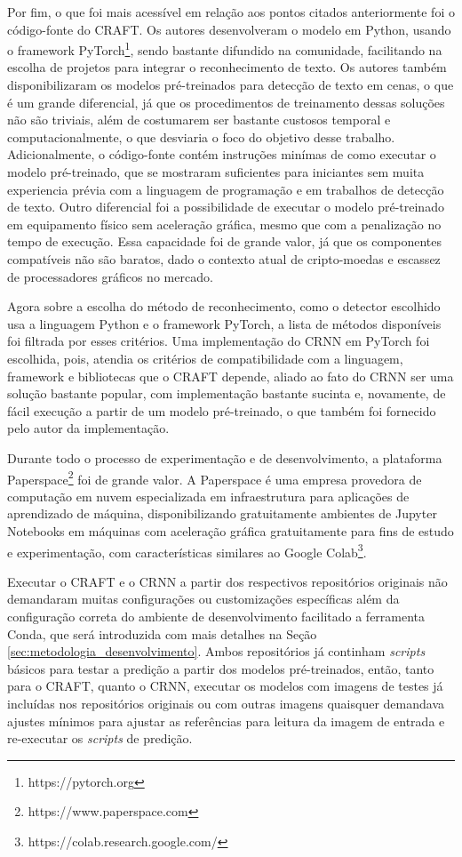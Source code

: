 Por fim, o que foi mais acessível em relação aos pontos citados anteriormente foi o código-fonte do CRAFT. Os autores desenvolveram o modelo em 
Python, usando o framework PyTorch\footnote{https://pytorch.org}, sendo bastante difundido na comunidade, facilitando na escolha de projetos para 
integrar o reconhecimento de texto. Os autores também disponibilizaram os modelos pré-treinados para detecção de texto em cenas, o que é um 
grande diferencial, já que os procedimentos de treinamento dessas soluções não são triviais, além de costumarem ser bastante custosos temporal 
e computacionalmente, o que desviaria o foco do objetivo desse trabalho. Adicionalmente, o código-fonte contém instruções minímas de como executar 
o modelo pré-treinado, que se mostraram suficientes para iniciantes sem muita experiencia prévia com a linguagem de programação e em trabalhos 
de detecção de texto. Outro diferencial foi a possibilidade de executar o modelo pré-treinado em equipamento físico sem aceleração gráfica, mesmo 
que com a penalização no tempo de execução. Essa capacidade foi de grande valor, já que os componentes compatíveis não são baratos, dado o contexto 
atual de cripto-moedas e escassez de processadores gráficos no mercado.

Agora sobre a escolha do método de reconhecimento, como o detector escolhido usa a linguagem Python e o framework PyTorch, a lista de métodos 
disponíveis foi filtrada por esses critérios. Uma implementação do CRNN em PyTorch foi escolhida, pois, atendia os critérios de compatibilidade 
com a linguagem, framework e bibliotecas que o CRAFT depende, aliado ao fato do CRNN ser uma solução bastante popular, com implementação bastante 
sucinta e, novamente, de fácil execução a partir de um modelo pré-treinado, o que também foi fornecido pelo autor da implementação.

Durante todo o processo de experimentação e de desenvolvimento, a plataforma Paperspace\footnote{https://www.paperspace.com} foi de grande valor. 
A Paperspace é uma empresa provedora de computação em nuvem especializada em infraestrutura para aplicações de aprendizado de máquina, disponibilizando 
gratuitamente ambientes de Jupyter Notebooks em máquinas com aceleração gráfica gratuitamente para fins de estudo e experimentação, com características 
similares ao Google Colab\footnote{https://colab.research.google.com/}.

Executar o CRAFT e o CRNN a partir dos respectivos repositórios originais não demandaram muitas configurações ou customizações específicas além da 
configuração correta do ambiente de desenvolvimento facilitado a ferramenta Conda, que será introduzida com mais detalhes na Seção \ref{sec:metodologia_desenvolvimento}.
 Ambos repositórios já continham \textit{scripts} básicos para testar a predição a partir dos modelos pré-treinados, então, tanto para o CRAFT, 
 quanto o CRNN, executar os modelos com imagens de testes já incluídas nos repositórios originais ou com outras imagens quaisquer demandava ajustes 
 mínimos para ajustar as referências para leitura da imagem de entrada e re-executar os \textit{scripts} de predição.

